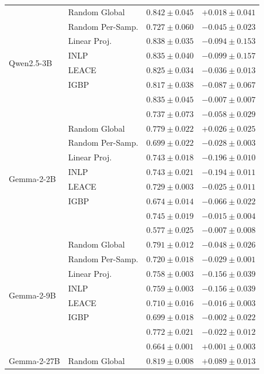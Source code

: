 \begin{longtable}{ll rr}
  \midrule
  \multirow{8}{*}{Qwen2.5-3B} & Random Global & $0.842{\pm}0.045$ & $+0.018{\pm}0.041$ \\
   & Random Per-Samp. & $0.727{\pm}0.060$ & $-0.045{\pm}0.023$ \\
   & Linear Proj. & $0.838{\pm}0.035$ & $-0.094{\pm}0.153$ \\
   & INLP & $0.835{\pm}0.040$ & $-0.099{\pm}0.157$ \\
   & LEACE & $0.825{\pm}0.034$ & $-0.036{\pm}0.013$ \\
   & IGBP & $0.817{\pm}0.038$ & $-0.087{\pm}0.067$ \\
   & \AmbGCE{} & $0.835{\pm}0.045$ & $-0.007{\pm}0.007$ \\
   & \TanGCE{} & \textbf{$0.737{\pm}0.073$} & $-0.058{\pm}0.029$ \\
  \midrule
  \multirow{8}{*}{Gemma-2-2B} & Random Global & $0.779{\pm}0.022$ & $+0.026{\pm}0.025$ \\
   & Random Per-Samp. & $0.699{\pm}0.022$ & $-0.028{\pm}0.003$ \\
   & Linear Proj. & $0.743{\pm}0.018$ & $-0.196{\pm}0.010$ \\
   & INLP & $0.743{\pm}0.021$ & $-0.194{\pm}0.011$ \\
   & LEACE & $0.729{\pm}0.003$ & $-0.025{\pm}0.011$ \\
   & IGBP & $0.674{\pm}0.014$ & $-0.066{\pm}0.022$ \\
   & \AmbGCE{} & $0.745{\pm}0.019$ & $-0.015{\pm}0.004$ \\
   & \TanGCE{} & \textbf{$0.577{\pm}0.025$} & $-0.007{\pm}0.008$ \\
  \midrule
  \multirow{8}{*}{Gemma-2-9B} & Random Global & $0.791{\pm}0.012$ & $-0.048{\pm}0.026$ \\
   & Random Per-Samp. & $0.720{\pm}0.018$ & $-0.029{\pm}0.001$ \\
   & Linear Proj. & $0.758{\pm}0.003$ & $-0.156{\pm}0.039$ \\
   & INLP & $0.759{\pm}0.003$ & $-0.156{\pm}0.039$ \\
   & LEACE & $0.710{\pm}0.016$ & $-0.016{\pm}0.003$ \\
   & IGBP & $0.699{\pm}0.018$ & $-0.002{\pm}0.022$ \\
   & \AmbGCE{} & $0.772{\pm}0.021$ & $-0.022{\pm}0.012$ \\
   & \TanGCE{} & \textbf{$0.664{\pm}0.001$} & $+0.001{\pm}0.003$ \\
  \midrule
  \multirow{8}{*}{Gemma-2-27B} & Random Global & $0.819{\pm}0.008$ & $+0.089{\pm}0.013$ \\

\end{longtable}
